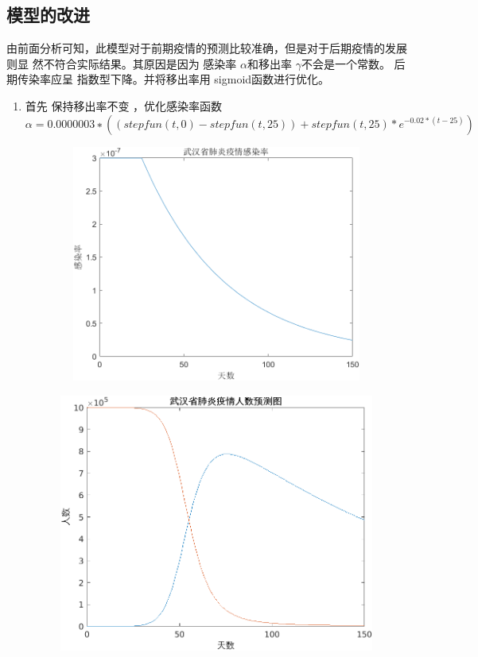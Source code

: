 \documentclass{article}
\begin{document}
\subsection{模型的改进}
由前面分析可知，此模型对于前期疫情的预测比较准确，但是对于后期疫情的发展则显
然不符合实际结果。其原因是因为 感染率 $\alpha$和移出率 $\gamma$不会是一个常数。
后期传染率应呈
指数型下降。并将移出率用 sigmoid函数进行优化。
\begin{enumerate}
  \item 首先 保持移出率不变 ，优化感染率函数
  $$\alpha =0.0000003∗((stepfun(t,0)-stepfun(t,25))+stepfun(t,25)*
  e^{-0.02*(t-25)})$$
  \begin{figure}[h!]
                \centering
                \includegraphics[width=15cm,height=7.8cm]{5.png}
                \end{figure}
    \begin{figure}[h!]
                \centering
                \includegraphics[width=15cm,height=8.5cm]{6.png}

\end{figure}
\end{enumerate}
\end{document}
